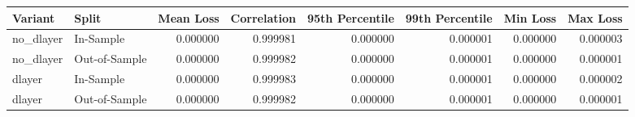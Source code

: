 \begin{tabular}{llrrrrrr}
\toprule
Variant & Split & Mean Loss & Correlation & 95th Percentile & 99th Percentile & Min Loss & Max Loss \\
\midrule
no_dlayer & In-Sample & 0.000000 & 0.999981 & 0.000000 & 0.000001 & 0.000000 & 0.000003 \\
no_dlayer & Out-of-Sample & 0.000000 & 0.999982 & 0.000000 & 0.000001 & 0.000000 & 0.000001 \\
dlayer & In-Sample & 0.000000 & 0.999983 & 0.000000 & 0.000001 & 0.000000 & 0.000002 \\
dlayer & Out-of-Sample & 0.000000 & 0.999982 & 0.000000 & 0.000001 & 0.000000 & 0.000001 \\
\bottomrule
\end{tabular}
